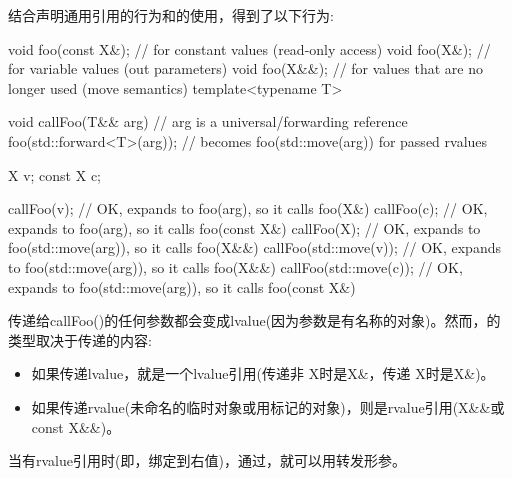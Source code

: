 结合声明通用引用的行为和的使用，得到了以下行为:

\begin{cppcode}
void foo(const X&); // for constant values (read-only access)
void foo(X&); // for variable values (out parameters)
void foo(X&&); // for values that are no longer used (move semantics)
template<typename T>

void callFoo(T&& arg) { // arg is a universal/forwarding reference
	foo(std::forward<T>(arg)); // becomes foo(std::move(arg)) for passed rvalues
}

X v;
const X c;

callFoo(v); // OK, expands to foo(arg), so it calls foo(X&)
callFoo(c); // OK, expands to foo(arg), so it calls foo(const X&)
callFoo(X{}); // OK, expands to foo(std::move(arg)), so it calls foo(X&&)
callFoo(std::move(v)); // OK, expands to foo(std::move(arg)), so it calls foo(X&&)
callFoo(std::move(c)); // OK, expands to foo(std::move(arg)), so it calls foo(const X&)
\end{cppcode}

传递给callFoo()的任何参数都会变成lvalue(因为参数是有名称的对象)。然而，的类型取决于传递的内容:

\begin{itemize}
	\item 如果传递lvalue，就是一个lvalue引用(传递非 X时是X\&，传递 X时是X\&)。
	\item 如果传递rvalue(未命名的临时对象或用标记的对象)，则是rvalue引用(X\&\&或const X\&\&)。
\end{itemize}

当有rvalue引用时(即，绑定到右值)，通过，就可以用转发形参。




















